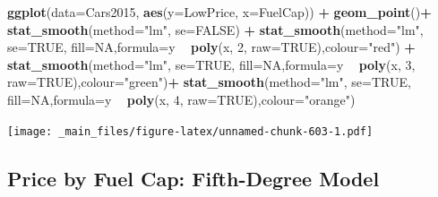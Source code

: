 \documentclass[]{book}
\newenvironment{Shaded}{\begin{snugshade}}{\end{snugshade}}
\newcommand{\KeywordTok}[1]{\textcolor[rgb]{0.13,0.29,0.53}{\textbf{#1}}}
\newcommand{\DataTypeTok}[1]{\textcolor[rgb]{0.13,0.29,0.53}{#1}}
\newcommand{\DecValTok}[1]{\textcolor[rgb]{0.00,0.00,0.81}{#1}}
\newcommand{\StringTok}[1]{\textcolor[rgb]{0.31,0.60,0.02}{#1}}
\newcommand{\OtherTok}[1]{\textcolor[rgb]{0.56,0.35,0.01}{#1}}
\newcommand{\OperatorTok}[1]{\textcolor[rgb]{0.81,0.36,0.00}{\textbf{#1}}}
\newcommand{\NormalTok}[1]{#1}
\begin{document}
\begin{Shaded}
\begin{Highlighting}[]
\KeywordTok{ggplot}\NormalTok{(}\DataTypeTok{data=}\NormalTok{Cars2015, }\KeywordTok{aes}\NormalTok{(}\DataTypeTok{y=}\NormalTok{LowPrice, }\DataTypeTok{x=}\NormalTok{FuelCap)) }\OperatorTok{+}\StringTok{ }\KeywordTok{geom_point}\NormalTok{()}\OperatorTok{+}\StringTok{ }\KeywordTok{stat_smooth}\NormalTok{(}\DataTypeTok{method=}\StringTok{"lm"}\NormalTok{, }\DataTypeTok{se=}\OtherTok{FALSE}\NormalTok{) }\OperatorTok{+}\StringTok{ }\KeywordTok{stat_smooth}\NormalTok{(}\DataTypeTok{method=}\StringTok{"lm"}\NormalTok{, }\DataTypeTok{se=}\OtherTok{TRUE}\NormalTok{, }\DataTypeTok{fill=}\OtherTok{NA}\NormalTok{,}\DataTypeTok{formula=}\NormalTok{y }\OperatorTok{~}\StringTok{ }\KeywordTok{poly}\NormalTok{(x, }\DecValTok{2}\NormalTok{, }\DataTypeTok{raw=}\OtherTok{TRUE}\NormalTok{),}\DataTypeTok{colour=}\StringTok{"red"}\NormalTok{) }\OperatorTok{+}\StringTok{ }
\StringTok{  }\KeywordTok{stat_smooth}\NormalTok{(}\DataTypeTok{method=}\StringTok{"lm"}\NormalTok{, }\DataTypeTok{se=}\OtherTok{TRUE}\NormalTok{, }\DataTypeTok{fill=}\OtherTok{NA}\NormalTok{,}\DataTypeTok{formula=}\NormalTok{y }\OperatorTok{~}\StringTok{ }\KeywordTok{poly}\NormalTok{(x, }\DecValTok{3}\NormalTok{, }\DataTypeTok{raw=}\OtherTok{TRUE}\NormalTok{),}\DataTypeTok{colour=}\StringTok{"green"}\NormalTok{)}\OperatorTok{+}\StringTok{ }
\StringTok{  }\KeywordTok{stat_smooth}\NormalTok{(}\DataTypeTok{method=}\StringTok{"lm"}\NormalTok{, }\DataTypeTok{se=}\OtherTok{TRUE}\NormalTok{, }\DataTypeTok{fill=}\OtherTok{NA}\NormalTok{,}\DataTypeTok{formula=}\NormalTok{y }\OperatorTok{~}\StringTok{ }\KeywordTok{poly}\NormalTok{(x, }\DecValTok{4}\NormalTok{, }\DataTypeTok{raw=}\OtherTok{TRUE}\NormalTok{),}\DataTypeTok{colour=}\StringTok{"orange"}\NormalTok{)}
\end{Highlighting}
\end{Shaded}

\texttt{[image: \_main\_files/figure-latex/unnamed-chunk-603-1.pdf]}

\subsection{Price by Fuel Cap: Fifth-Degree
Model}\label{price-by-fuel-cap-fifth-degree-model}
\end{document}
